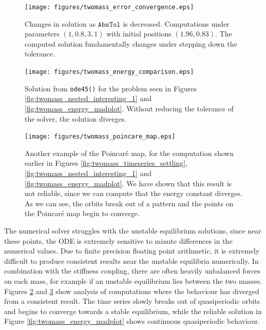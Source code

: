 \begin{figure}[h!]
	\centering
	\texttt{[image: figures/twomass\_error\_convergence.eps]}
	\caption{
		Changes in solution as \(\mathtt{AbsTol}\) is decreased.
		Computations under parameters \((1, 0.8, 3, 1)\) with initial positions \((1.96, 0.83)\).
		The computed solution fundamentally changes under stepping down the tolerance.   
	}
	\label{fig:twomass_stepping_tolerance}
\end{figure}

\begin{figure}[h!]
	\centering
	\texttt{[image: figures/twomass\_energy\_comparison.eps]}
	\caption{
		Solution from \texttt{ode45()} for the problem seen in Figures \ref{fig:twomass_nested_interesting_1} and \ref{fig:twomass_energy_madplot}.
		Without reducing the tolerance of the solver,
		the solution diverges.
	}
	\label{fig:twomass_energy_mistake}
\end{figure}

\begin{figure}[h!]
	\centering
	\texttt{[image: figures/twomass\_poincare\_map.eps]}
	\caption{
		Another example of the Poincar\'e map, for the computation shown earlier in Figures \ref{fig:twomass_timeseries_settling}, \ref{fig:twomass_nested_interesting_1} and \ref{fig:twomass_energy_madplot}.
		We have shown that this result is not reliable, since we can compute that the energy constant diverges.
		As we can see, the orbits break out of a pattern and the points on the Poincar\'e map begin to converge.
	}
	\label{fig:twomass_poincare_bad}
\end{figure}

The numerical solver struggles with the unstable equilibrium solutions,
since near these points, the ODE is extremely sensitive to minute differences in the numerical values.
Due to finite precision floating point arithmetic,
it is extremely difficult to produce consistent results near the unstable equilibria numerically.
In combination with the stiffness coupling, there are often heavily unbalanced forces on each mass,
for example if an unstable equilibrium lies between the two masses.
Figures \ref{fig:twomass_energy_mistake} and \ref{fig:twomass_poincare_bad} show analysis of computations where the behaviour has diverged from a consistent result.
The time series slowly breaks out of quasiperiodic orbits and begins to converge towards a stable equilibrium,
while the reliable solution in Figure \ref{fig:twomass_energy_madplot} shows continuous quasiperiodic behaviour.

